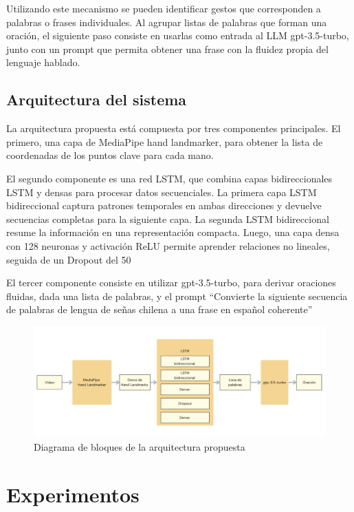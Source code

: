 \documentclass{article}
\begin{document}
Utilizando este mecanismo se pueden identificar gestos que corresponden a palabras o frases individuales. Al agrupar listas de palabras que forman una oración, el siguiente paso consiste en usarlas como entrada al LLM gpt-3.5-turbo, junto con un prompt que permita obtener una frase con la fluidez propia del lenguaje hablado.

\subsection{Arquitectura del sistema}

La arquitectura propuesta está compuesta por tres componentes principales. El primero, una capa de MediaPipe hand landmarker, para obtener la lista de coordenadas de los puntos clave para cada mano.

El segundo componente es una red LSTM, que combina capas bidireccionales LSTM y densas para procesar datos secuenciales. La primera capa LSTM bidireccional captura patrones temporales en ambas direcciones y devuelve secuencias completas para la siguiente capa. La segunda LSTM bidireccional resume la información en una representación compacta. Luego, una capa densa con 128 neuronas y activación ReLU permite aprender relaciones no lineales, seguida de un Dropout del 50%

El tercer componente consiste en utilizar gpt-3.5-turbo, para derivar oraciones fluidas, dada una lista de palabras, y el prompt “Convierte la siguiente secuencia de palabras de lengua de señas chilena a una frase en español coherente”

\begin{figure}[!hbtp]
    \centering
    \includegraphics[width=5in]{figuras/architecture-diagram.png}
		\caption{Diagrama de bloques de la arquitectura propuesta}
		\label{fig1}
\end{figure}

\section{Experimentos}
\end{document}
